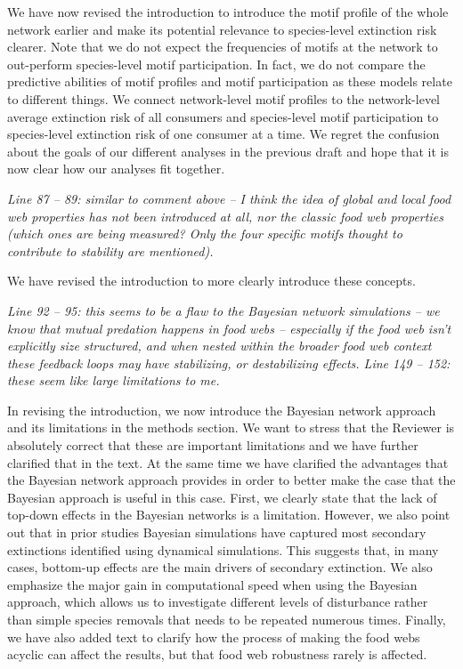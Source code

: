 \documentclass[12pt]{article}
\newcommand{\us}{\rm \setlength{\leftskip}{0.3cm} \setlength{\rightskip}{0.3cm}}
\newcommand{\them}{\it \setlength{\leftskip}{0cm} \setlength{\rightskip}{0cm}}
\begin{document}
        \us
        We have now revised the introduction to introduce the motif profile of the whole network earlier and make its potential relevance to species-level extinction risk clearer.
        Note that we do not expect the frequencies of motifs at the network to out-perform species-level motif participation. In fact, we do not compare the predictive abilities of motif profiles and motif participation as these models relate to different things. We connect network-level motif profiles to the network-level average extinction risk of all consumers and species-level motif participation to species-level extinction risk of one consumer at a time. We regret the confusion about the goals of our different analyses in the previous draft and hope that it is now clear how our analyses fit together.
        
        
        
        \them
        Line 87 – 89: similar to comment above – I think the idea of global and local food web properties has not been introduced at all, nor the classic food web properties (which ones are being measured? Only the four specific motifs thought to contribute to stability are mentioned).
        
        \us We have revised the introduction to more clearly introduce these concepts. 
        
        \them
        Line 92 – 95: this seems to be a flaw to the Bayesian network simulations – we know that mutual predation happens in food webs – especially if the food web isn't explicitly size structured, and when nested within the broader food web context these feedback loops may have stabilizing, or destabilizing effects.
        \smallskip
        Line 149 – 152: these seem like large limitations to me.
        
        
        \us In revising the introduction, we now introduce the Bayesian network approach and its limitations in the methods section. We want to stress that the Reviewer is absolutely correct that these are important limitations and we have further clarified that in the text. At the same time we have clarified the advantages that the Bayesian network approach provides in order to better make the case that the Bayesian approach is useful in this case.
        First, we clearly state that the lack of top-down effects in the Bayesian networks is a limitation. However, we also point out that in prior studies Bayesian simulations have captured most secondary extinctions identified using dynamical simulations. This suggests that, in many cases, bottom-up effects are the main drivers of secondary extinction. We also emphasize the major gain in computational speed when using the Bayesian approach, which allows us to investigate different levels of disturbance rather than simple species removals that needs to be repeated numerous times. Finally, we have also added text to clarify how the process of making the food webs acyclic can affect the results, but that food web robustness rarely is affected.  
        
\end{document}
